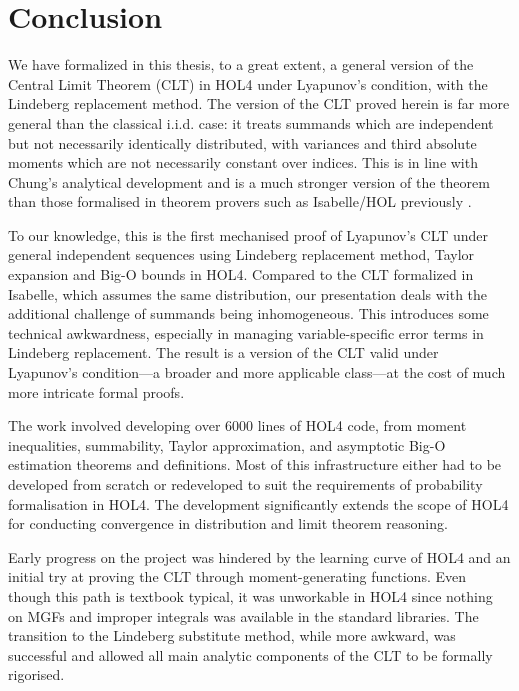 \chapter{Conclusion}
\label{concl}

We have formalized in this thesis, to a great extent, a general version of the Central Limit Theorem (CLT) in HOL4 under Lyapunov's condition, with the Lindeberg replacement method. The version of the CLT proved herein is far more general than the classical i.i.d. case: it treats summands which are independent but not necessarily identically distributed, with variances and third absolute moments which are not necessarily constant over indices. This is in line with Chung's analytical development \cite{Chung:2001} and is a much stronger version of the theorem than those formalised in theorem provers such as Isabelle/HOL previously \cite{serafin2015formally}.

To our knowledge, this is the first mechanised proof of Lyapunov’s CLT under general independent sequences using Lindeberg replacement method, Taylor expansion and Big-O bounds in HOL4. Compared to the CLT formalized in Isabelle, which assumes the same distribution, our presentation deals with the additional challenge of summands being inhomogeneous. This introduces some technical awkwardness, especially in managing variable-specific error terms in Lindeberg replacement. The result is a version of the CLT valid under Lyapunov's condition—a broader and more applicable class—at the cost of much more intricate formal proofs.

The work involved developing over 6000 lines of HOL4 code, from moment inequalities, summability, Taylor approximation, and asymptotic Big-O estimation theorems and definitions. Most of this infrastructure either had to be developed from scratch or redeveloped to suit the requirements of probability formalisation in HOL4. The development significantly extends the scope of HOL4 for conducting convergence in distribution and limit theorem reasoning.

Early progress on the project was hindered by the learning curve of HOL4 and an initial try at proving the CLT through moment-generating functions. Even though this path is textbook typical, it was unworkable in HOL4 since nothing on MGFs and improper integrals was available in the standard libraries. The transition to the Lindeberg substitute method, while more awkward, was successful and allowed all main analytic components of the CLT to be formally rigorised.

